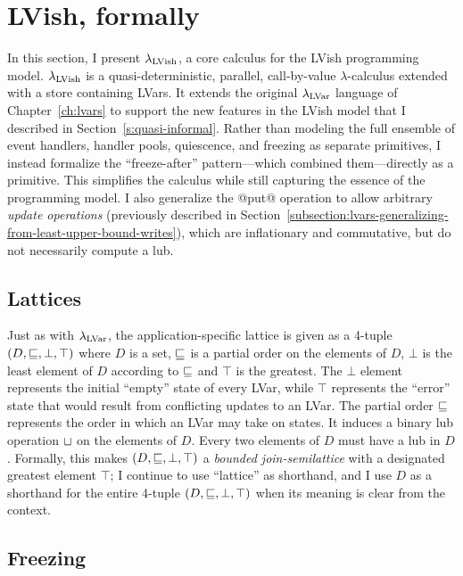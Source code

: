 \section{LVish, formally}\label{s:quasi-formal}

In this section, I present $\lambda_{\textrm{LVish}}$, a core calculus for the
LVish programming model. $\lambda_{\textrm{LVish}}$ is a quasi-deterministic,
parallel, call-by-value $\lambda$-calculus extended with a store
containing LVars.  It extends the original $\lambda_{\textrm{LVar}}$ language of
Chapter~\ref{ch:lvars} to support the new features in the LVish model
that I described in Section~\ref{s:quasi-informal}. Rather than
modeling the full ensemble of event handlers, handler pools,
quiescence, and freezing as separate primitives, I instead formalize
the ``freeze-after'' pattern---which combined them---directly as a
primitive.  This simplifies the calculus while still capturing the
essence of the programming model.  I also generalize the @put@
operation to allow arbitrary \emph{update operations} (previously
described in
Section~\ref{subsection:lvars-generalizing-from-least-upper-bound-writes}),
which are inflationary and commutative, but do not necessarily compute
a lub.

\subsection{Lattices}

Just as with $\lambda_{\textrm{LVar}}$, the application-specific lattice is given
as a 4-tuple $(D, \sqsubseteq, \bot, \top)$ where $D$ is a set,
$\sqsubseteq$ is a partial order on the elements of $D$, $\bot$ is the
least element of $D$ according to $\sqsubseteq$ and $\top$ is the
greatest.  The $\bot$ element represents the initial ``empty'' state
of every LVar, while $\top$ represents the ``error'' state that would
result from conflicting updates to an LVar.  The partial order
$\sqsubseteq$ represents the order in which an LVar may take on states.
It induces a binary lub operation $ \sqcup $ on the elements of
$D$.  Every two elements of $D$ must have a lub in $D$.  Formally,
this makes $(D, \sqsubseteq, \bot, \top)$ a \emph{bounded
  join-semilattice} with a designated greatest element $\top$; I
continue to use ``lattice'' as shorthand, and I use $D$ as a shorthand
for the entire 4-tuple $(D, \sqsubseteq, \bot, \top)$ when its meaning is
clear from the context. 

\subsection{Freezing}

